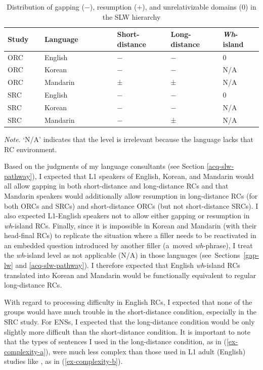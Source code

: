 \begin{table}
\caption{Distribution of gapping (−), resumption (+), and unrelativizable domains (0) in the SLW hierarchy}\label{tab:slw}
\raggedright{}
\begin{tabularx}{\linewidth}{llXXX}\toprule
Study & Language & Short-distance & Long-distance & \textit{Wh}-island \\\midrule
ORC~~~~ & English & − & − & 0 \\
ORC & Korean & − & − & N/A \\
ORC & Mandarin~~~~~~~~~~ & ± & ± & N/A \\
SRC & English & − & − & 0 \\
SRC & Korean & − & − & N/A \\
SRC & Mandarin & − & ± & N/A \\\bottomrule
\end{tabularx}
\textit{Note}. `N/A' indicates that the level is irrelevant because the language lacks that RC environment.
\vspace{-12pt}
\end{table}

Based on the judgments of my language consultants (see Section \ref{acq-slw-pathway}), I expected that L1 speakers of English, Korean, and Mandarin would all allow gapping in both short-distance and long-distance RCs and that Mandarin speakers would additionally allow resumption in long-distance RCs (for both ORCs and SRCs) and short-distance ORCs (but not short-distance SRCs). I also expected L1-English speakers not to allow either gapping or resumption in \textit{wh}-island RCs. Finally, since it is impossible in Korean and Mandarin (with their head-final RCs) to replicate the situation where a filler needs to be reactivated in an embedded question introduced by another filler (a~moved \textit{wh}-phrase), I treat the \textit{wh}-island level as not applicable (N/A) in those languages (see~Sections~\ref{gap-lw} and \ref{acq-slw-pathway}). I therefore expected that English \textit{wh}-island RCs translated into Korean and Mandarin would be functionally equivalent to regular long-distance RCs.

With regard to processing difficulty in English RCs, I expected that none of the groups would have much trouble in the short-distance condition, especially in the SRC study. For ENSs, I expected that the long-distance condition would be only slightly more difficult than the short-distance condition. It is important to note that the types of sentences I used in the long-distance condition, as in (\ref{ex-complexity-a}), were much less complex than those used in L1 adult (English) studies like \textcite{hofmeister.norcliffe2013}, as in (\ref{ex-complexity-b}). 

